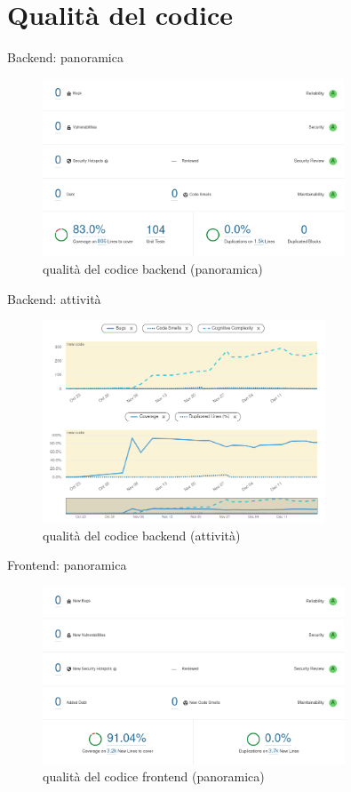 \documentclass{beamer}
\begin{document}
\section{Qualità del codice}
\begin{frame}{Backend: panoramica}
	\begin{figure}
		\includegraphics[width=0.8\textwidth]{quality-backend-overall}
		\caption{qualità del codice backend (panoramica)}
	\end{figure}
\end{frame}

\begin{frame}{Backend: attività}
	\begin{figure}
		\includegraphics[width=0.75\textwidth]{quality-backend-activity}
		\caption{qualità del codice backend (attività)}
	\end{figure}
\end{frame}

\begin{frame}{Frontend: panoramica}
	\begin{figure}
		\includegraphics[width=0.8\textwidth]{quality-frontend-overall}
		\caption{qualità del codice frontend (panoramica)}
	\end{figure}
\end{frame}
\end{document}
